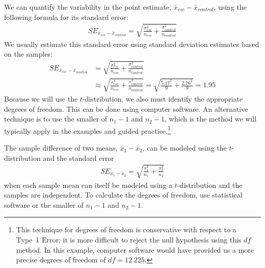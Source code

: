 {We can quantify the variability in the point estimate, $\bar{x}_{esc} - \bar{x}_{control}$, using the following formula for its standard error:
\begin{eqnarray*}
SE_{\bar{x}_{esc} - \bar{x}_{control}} = \sqrt{\frac{\sigma_{esc}^2}{n_{esc}} + \frac{\sigma_{control}^2}{n_{control}}}
\end{eqnarray*}
We usually estimate this standard error using standard deviation estimates  based on the samples:
\begin{align*}
SE_{\bar{x}_{esc} - \bar{x}_{control}}
	&= \sqrt{\frac{\sigma_{esc}^2}{n_{esc}} + \frac{\sigma_{control}^2}{n_{control}}} \\
	&\approx \sqrt{\frac{s_{esc}^2}{n_{esc}} + \frac{s_{control}^2}{n_{control}}}
	= \sqrt{\frac{5.17^2}{9} + \frac{2.76^2}{9}} = 1.95
\end{align*}
Because we will use the $t$-distribution, we also must identify the appropriate degrees of freedom. This can be done using computer software. An alternative technique is to use the smaller of $n_1 - 1$ and $n_2 - 1$, which is the method we will typically apply in the examples and guided practice.\footnote{This technique for degrees of freedom is conservative with respect to a Type~1 Error; it is more difficult to reject the null hypothesis using this $df$ method. In this example, computer software would have provided us a more precise degrees of freedom of $df = 12.225$.}

\begin{termBox}{
The sample difference of two means, $\bar{x}_1 - \bar{x}_2$, can be modeled using the $t$-distribution and the standard error
\begin{eqnarray}
\textstyle
SE_{\bar{x}_{1} - \bar{x}_{2}} = \sqrt{\frac{s_1^2}{n_1} + \frac{s_2^2}{n_2}}
\label{seOfDifferenceInMeans}
\end{eqnarray}
when each sample mean can itself be modeled using a $t$-distribution and the samples are independent. To calculate the degrees of freedom, use statistical software or the smaller of $n_1 - 1$ and $n_2 - 1$.}
\end{termBox}

}
